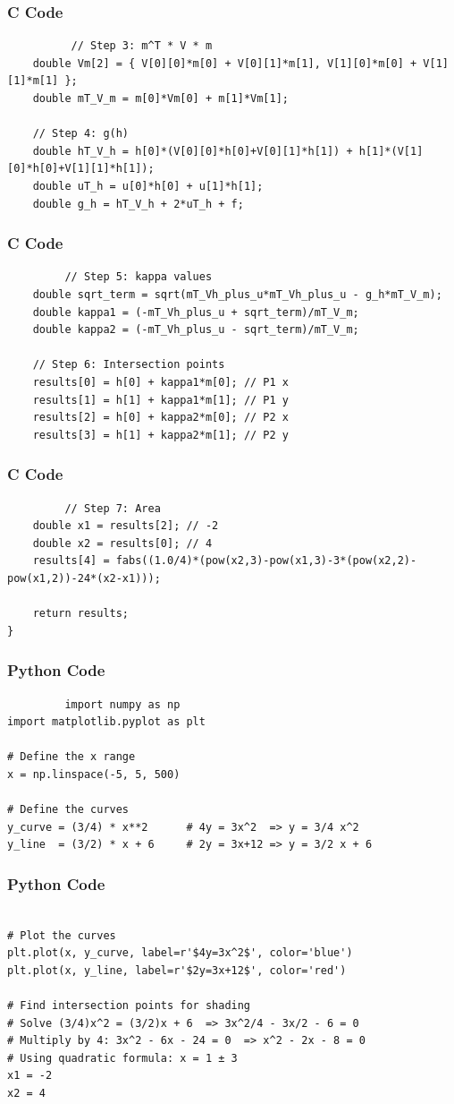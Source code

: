 \documentclass{beamer}
\begin{document}
  \begin{frame}[fragile]
     \frametitle{C Code}
     \begin{lstlisting}
          // Step 3: m^T * V * m
    double Vm[2] = { V[0][0]*m[0] + V[0][1]*m[1], V[1][0]*m[0] + V[1][1]*m[1] };
    double mT_V_m = m[0]*Vm[0] + m[1]*Vm[1];

    // Step 4: g(h)
    double hT_V_h = h[0]*(V[0][0]*h[0]+V[0][1]*h[1]) + h[1]*(V[1][0]*h[0]+V[1][1]*h[1]);
    double uT_h = u[0]*h[0] + u[1]*h[1];
    double g_h = hT_V_h + 2*uT_h + f;
     \end{lstlisting}
 \end{frame}
  \begin{frame}[fragile]
     \frametitle{C Code}
     \begin{lstlisting}
         // Step 5: kappa values
    double sqrt_term = sqrt(mT_Vh_plus_u*mT_Vh_plus_u - g_h*mT_V_m);
    double kappa1 = (-mT_Vh_plus_u + sqrt_term)/mT_V_m;
    double kappa2 = (-mT_Vh_plus_u - sqrt_term)/mT_V_m;

    // Step 6: Intersection points
    results[0] = h[0] + kappa1*m[0]; // P1 x
    results[1] = h[1] + kappa1*m[1]; // P1 y
    results[2] = h[0] + kappa2*m[0]; // P2 x
    results[3] = h[1] + kappa2*m[1]; // P2 y
     \end{lstlisting}
 \end{frame}
  \begin{frame}[fragile]
     \frametitle{C Code}
     \begin{lstlisting}
         // Step 7: Area
    double x1 = results[2]; // -2
    double x2 = results[0]; // 4
    results[4] = fabs((1.0/4)*(pow(x2,3)-pow(x1,3)-3*(pow(x2,2)-pow(x1,2))-24*(x2-x1)));

    return results;
}
 \end{lstlisting}
 \end{frame}
 \begin{frame}[fragile]
 \frametitle{Python Code}
     \begin{lstlisting}
         import numpy as np
import matplotlib.pyplot as plt

# Define the x range
x = np.linspace(-5, 5, 500)

# Define the curves
y_curve = (3/4) * x**2      # 4y = 3x^2  => y = 3/4 x^2
y_line  = (3/2) * x + 6     # 2y = 3x+12 => y = 3/2 x + 6

     \end{lstlisting}
 \end{frame}
 \begin{frame}[fragile]
 \frametitle{Python Code}
     \begin{lstlisting}
        
# Plot the curves
plt.plot(x, y_curve, label=r'$4y=3x^2$', color='blue')
plt.plot(x, y_line, label=r'$2y=3x+12$', color='red')

# Find intersection points for shading
# Solve (3/4)x^2 = (3/2)x + 6  => 3x^2/4 - 3x/2 - 6 = 0
# Multiply by 4: 3x^2 - 6x - 24 = 0  => x^2 - 2x - 8 = 0
# Using quadratic formula: x = 1 ± 3
x1 = -2
x2 = 4
 
     \end{lstlisting}
 \end{frame}
\end{document}
